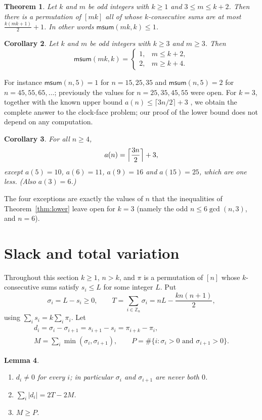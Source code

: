 \documentclass[11pt]{amsart}
\newtheorem{theorem}{Theorem}
\newtheorem{corollary}[theorem]{Corollary}
\newtheorem{lemma}[theorem]{Lemma}
\theoremstyle{remark}
\newcommand{\msum}{\mathsf{msum}}
\newcommand{\Z}{\mathbb{Z}}
\begin{document}
\begin{theorem}\label{thm:construction}
Let $k$ and $m$ be odd integers with $k\ge1$ and $3\le m\le k+2$. Then there is a permutation of $[mk]$ all of whose
$k$-consecutive sums are at most $\frac{k(mk+1)}{2}+1$. In other words $\msum(mk,k)\le1$.
\end{theorem}

\begin{corollary}\label{cor:mk}
Let $k$ and $m$ be odd integers with $k\ge3$ and $m\ge3$. Then
\[
  \msum(mk,k)=\begin{cases}1,& m\le k+2,\\ 2,& m\ge k+4.\end{cases}
\]
\end{corollary}

For instance $\msum(n,5)=1$ for $n=15,25,35$ and $\msum(n,5)=2$ for $n=45,55,65,\dots$; previously the values for
$n=25,35,45,55$ were open. For $k=3$, together with the known upper bound $a(n)\le\lceil 3n/2\rceil+3$
\cite{AFG,OEIS}, we obtain the complete answer to the clock-face problem; our proof of the lower bound does not
depend on any computation.

\begin{corollary}\label{cor:clock}
For all $n\ge4$,
\[
  a(n)=\Bigl\lceil\frac{3n}{2}\Bigr\rceil+3,
\]
except $a(5)=10$, $a(6)=11$, $a(9)=16$ and $a(15)=25$, which are one less. (Also $a(3)=6$.)
\end{corollary}

The four exceptions are exactly the values of $n$ that the inequalities of Theorem~\ref{thm:lower} leave open
for $k=3$ (namely the odd $n\le 6\gcd(n,3)$, and $n=6$).

\section{Slack and total variation}

Throughout this section $k\ge1$, $n>k$, and $\pi$ is a permutation of $[n]$ whose $k$-consecutive sums satisfy
$s_i\le L$ for some integer $L$. Put
\[
  \sigma_i=L-s_i\ge0,\qquad T=\sum_{i\in\Z_n}\sigma_i=nL-\frac{kn(n+1)}{2},
\]
using $\sum_i s_i=k\sum_i\pi_i$. Let
\begin{gather*}
  d_i=\sigma_i-\sigma_{i+1}=s_{i+1}-s_i=\pi_{i+k}-\pi_i ,\\
  M=\sum_{i}\min(\sigma_i,\sigma_{i+1}),\qquad P=\#\{i:\sigma_i>0\text{ and }\sigma_{i+1}>0\}.
\end{gather*}

\begin{lemma}\label{lem:basic}
\begin{enumerate}
\item[(i)] $d_i\ne0$ for every $i$; in particular $\sigma_i$ and $\sigma_{i+1}$ are never both $0$.
\item[(ii)] $\sum_i|d_i|=2T-2M$.
\item[(iii)] $M\ge P$.
\end{enumerate}
\end{lemma}
\end{document}
